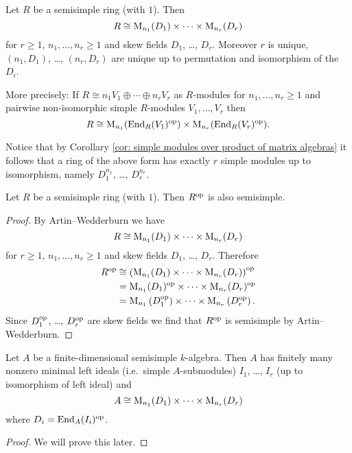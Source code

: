 \begin{thrm}
 Let $R$ be a semisimple ring (with $1$). Then
 \[
  R \cong \operatorname{M}_{n_1}(D_1) \times \dotsm \times \operatorname{M}_{n_r}(D_r)
 \]
 for $r \geq 1$, $n_1, \dotsc, n_r \geq 1$ and skew fields $D_1$, \dots, $D_r$. Moreover $r$ is unique, $(n_1,D_1)$, \dots, $(n_r,D_r)$ are unique up to permutation and isomorphism of the $D_i$.
 
 More precisely: If $R \cong n_1 V_1 \oplus \dotsb \oplus n_r V_r$ as $R$-modules for $n_1, \dotsc, n_r \geq 1$ and pairwise non-isomorphic simple $R$-modules $V_1, \dotsc, V_r$ then
 \[
  R \cong \operatorname{M}_{n_1}(\operatorname{End}_R(V_1)^{\mathrm{op}}) \times \operatorname{M}_{n_r}(\operatorname{End}_R(V_r)^{\mathrm{op}}).
 \]
\end{thrm}


Notice that by Corollary \ref{cor: simple modules over product of matrix algebras} it follows that a ring of the above form has exactly $r$ simple modules up to isomorphism, namely $D_1^{n_1}$, \dots, $D_r^{n_r}$.


\begin{cor}
 Let $R$ be a semisimple ring (with $1$). Then $R^{\mathrm{op}}$ is also semisimple.
\end{cor}
\begin{proof}
 By Artin--Wedderburn we have
 \[
  R \cong \operatorname{M}_{n_1}(D_1) \times \dotsm \times \operatorname{M}_{n_r}(D_r)
 \]
 for $r \geq 1$, $n_1, \dotsc, n_r \geq 1$ and skew fields $D_1$, \dots, $D_r$. Therefore
 \begin{align*}
  R^{\mathrm{op}}
  &\cong \left( \operatorname{M}_{n_1}(D_1) \times \dotsm \times \operatorname{M}_{n_r}(D_r) \right)^{\mathrm{op}} \\
  &= \operatorname{M}_{n_1}(D_1)^{\mathrm{op}} \times \dotsm \times \operatorname{M}_{n_r}(D_r)^{\mathrm{op}} \\
  &= \operatorname{M}_{n_1}\left(D_1^{\mathrm{op}}\right) \times \dotsm \times \operatorname{M}_{n_r}\left(D_r^{\mathrm{op}}\right).
 \end{align*}
 Since $D_1^{\mathrm{op}}$, \dots, $D_r^{\mathrm{op}}$ are skew fields we find that $R^{\mathrm{op}}$ is semisimple by Artin--Wedderburn.
\end{proof}


\begin{cor}
 Let $A$ be a finite-dimensional semisimple $k$-algebra. Then $A$ has finitely many nonzero minimal left ideals (i.e.\ simple $A$-submodules) $I_1$, \dots, $I_r$ (up to isomorphism of left ideal) and
 \[
  A \cong \operatorname{M}_{n_1}(D_1) \times \dotsm \times \operatorname{M}_{n_r}(D_r)
 \]
 where $D_i = \operatorname{End}_A(I_i)^{\mathrm{op}}$.
\end{cor}
\begin{proof}
 We will prove this later.
\end{proof}


